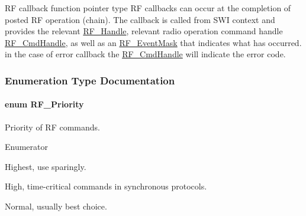 R\+F callback function pointer type R\+F callbacks can occur at the completion of posted R\+F operation (chain). The callback is called from S\+W\+I context and provides the relevant \hyperlink{_r_f_8h_a5e8ab7fc87fb818f435d9b6226ee573f}{R\+F\+\_\+\+Handle}, relevant radio operation command handle \hyperlink{_r_f_8h_acab1f56c62a9fd1ad0a91a46b6da23f1}{R\+F\+\_\+\+Cmd\+Handle}, as well as an \hyperlink{_r_f_8h_a128c46e18dbbaa781abb7abafc35233a}{R\+F\+\_\+\+Event\+Mask} that indicates what has occurred. in the case of error callback the \hyperlink{_r_f_8h_acab1f56c62a9fd1ad0a91a46b6da23f1}{R\+F\+\_\+\+Cmd\+Handle} will indicate the error code. 



\subsubsection{Enumeration Type Documentation}
\paragraph[{R\+F\+\_\+\+Priority}]{\setlength{\rightskip}{0pt plus 5cm}enum {\bf R\+F\+\_\+\+Priority}}\label{_r_f_8h_ae5f9a893d178e64e6d0a7a783ea06e32}


Priority of R\+F commands. 

\begin{Desc}
\item[Enumerator]\par
\begin{description}
\item[{\em 
R\+F\+\_\+\+Priority\+Highest\label{_r_f_8h_ae5f9a893d178e64e6d0a7a783ea06e32a5d716915abbe5a6fad3469c339f4db15}
}]Highest, use sparingly. \item[{\em 
R\+F\+\_\+\+Priority\+High\label{_r_f_8h_ae5f9a893d178e64e6d0a7a783ea06e32a8d14673dbb643f2e9571fb5e34aad23d}
}]High, time-\/critical commands in synchronous protocols. \item[{\em 
R\+F\+\_\+\+Priority\+Normal\label{_r_f_8h_ae5f9a893d178e64e6d0a7a783ea06e32a301d2e5af295d52039b52709952a1c47}
}]Normal, usually best choice. \end{description}
\end{Desc}
